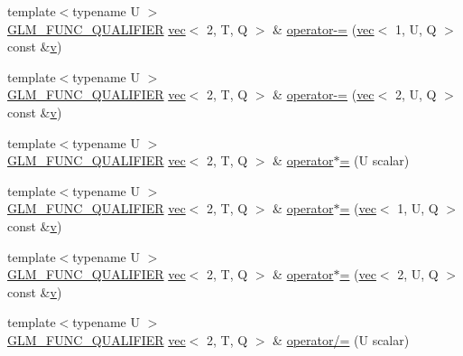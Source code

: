 \begin{DoxyCompactItemize}
\item 
{\footnotesize template$<$typename U $>$ }\\\hyperlink{setup_8hpp_a33fdea6f91c5f834105f7415e2a64407}{G\+L\+M\+\_\+\+F\+U\+N\+C\+\_\+\+Q\+U\+A\+L\+I\+F\+I\+ER} \hyperlink{structglm_1_1vec}{vec}$<$ 2, T, Q $>$ \& \hyperlink{structglm_1_1vec_3_012_00_01_t_00_01_q_01_4_a567c2cbb4b73916d5d4ae45058074aea}{operator-\/=} (\hyperlink{structglm_1_1vec}{vec}$<$ 1, U, Q $>$ const \&\hyperlink{_s_d_l__opengl_8h_a10a82eabcb59d2fcd74acee063775f90}{v})
\item 
{\footnotesize template$<$typename U $>$ }\\\hyperlink{setup_8hpp_a33fdea6f91c5f834105f7415e2a64407}{G\+L\+M\+\_\+\+F\+U\+N\+C\+\_\+\+Q\+U\+A\+L\+I\+F\+I\+ER} \hyperlink{structglm_1_1vec}{vec}$<$ 2, T, Q $>$ \& \hyperlink{structglm_1_1vec_3_012_00_01_t_00_01_q_01_4_ae73ba64842a46d90b3e6a61df288f70d}{operator-\/=} (\hyperlink{structglm_1_1vec}{vec}$<$ 2, U, Q $>$ const \&\hyperlink{_s_d_l__opengl_8h_a10a82eabcb59d2fcd74acee063775f90}{v})
\item 
{\footnotesize template$<$typename U $>$ }\\\hyperlink{setup_8hpp_a33fdea6f91c5f834105f7415e2a64407}{G\+L\+M\+\_\+\+F\+U\+N\+C\+\_\+\+Q\+U\+A\+L\+I\+F\+I\+ER} \hyperlink{structglm_1_1vec}{vec}$<$ 2, T, Q $>$ \& \hyperlink{structglm_1_1vec_3_012_00_01_t_00_01_q_01_4_ad360d1fd9201d64bc34e5357e59d69ec}{operator$\ast$=} (U scalar)
\item 
{\footnotesize template$<$typename U $>$ }\\\hyperlink{setup_8hpp_a33fdea6f91c5f834105f7415e2a64407}{G\+L\+M\+\_\+\+F\+U\+N\+C\+\_\+\+Q\+U\+A\+L\+I\+F\+I\+ER} \hyperlink{structglm_1_1vec}{vec}$<$ 2, T, Q $>$ \& \hyperlink{structglm_1_1vec_3_012_00_01_t_00_01_q_01_4_ab1148ae3c3b8be0f46dd17ba8447ee55}{operator$\ast$=} (\hyperlink{structglm_1_1vec}{vec}$<$ 1, U, Q $>$ const \&\hyperlink{_s_d_l__opengl_8h_a10a82eabcb59d2fcd74acee063775f90}{v})
\item 
{\footnotesize template$<$typename U $>$ }\\\hyperlink{setup_8hpp_a33fdea6f91c5f834105f7415e2a64407}{G\+L\+M\+\_\+\+F\+U\+N\+C\+\_\+\+Q\+U\+A\+L\+I\+F\+I\+ER} \hyperlink{structglm_1_1vec}{vec}$<$ 2, T, Q $>$ \& \hyperlink{structglm_1_1vec_3_012_00_01_t_00_01_q_01_4_a4f386a696770fd88224391b4d41f14e3}{operator$\ast$=} (\hyperlink{structglm_1_1vec}{vec}$<$ 2, U, Q $>$ const \&\hyperlink{_s_d_l__opengl_8h_a10a82eabcb59d2fcd74acee063775f90}{v})
\item 
{\footnotesize template$<$typename U $>$ }\\\hyperlink{setup_8hpp_a33fdea6f91c5f834105f7415e2a64407}{G\+L\+M\+\_\+\+F\+U\+N\+C\+\_\+\+Q\+U\+A\+L\+I\+F\+I\+ER} \hyperlink{structglm_1_1vec}{vec}$<$ 2, T, Q $>$ \& \hyperlink{structglm_1_1vec_3_012_00_01_t_00_01_q_01_4_aa079256ad1b556250e46558103a984e8}{operator/=} (U scalar)

\end{DoxyCompactItemize}

